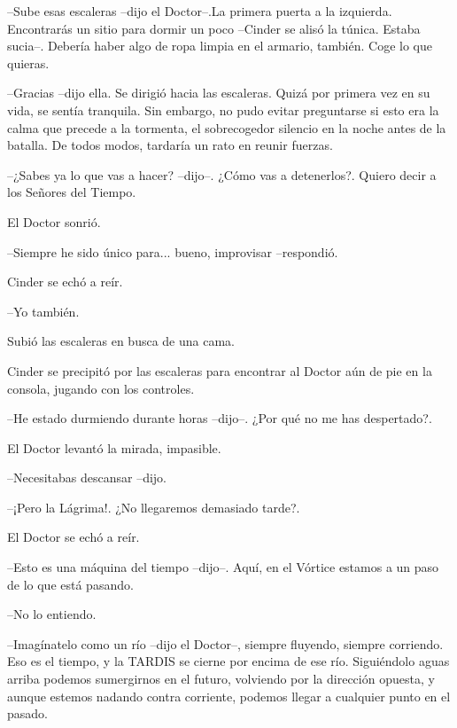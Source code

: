 --Sube esas escaleras --dijo el Doctor--.La primera puerta a la izquierda. Encontrarás un sitio para dormir un poco --Cinder se alisó la túnica. Estaba sucia--. Debería haber algo de ropa limpia en el armario, también. Coge lo que quieras.

--Gracias --dijo ella. Se dirigió hacia las escaleras. Quizá por primera vez en su vida, se sentía tranquila. Sin embargo, no pudo evitar preguntarse si esto era la calma que precede a la tormenta, el sobrecogedor silencio en la noche antes de la batalla. De todos modos, tardaría un rato en reunir fuerzas.

--¿Sabes ya lo que vas a hacer? --dijo--. ¿Cómo vas a detenerlos?. Quiero decir a los Señores del Tiempo.



El Doctor sonrió. 



--Siempre he sido único para... bueno, improvisar --respondió.



Cinder se echó a reír. 



--Yo también.



Subió las escaleras en busca de una cama.

Cinder se precipitó por las escaleras para encontrar al Doctor aún de pie en la consola, jugando con los controles. 



--He estado durmiendo durante horas --dijo--. ¿Por qué no me has despertado?.



El Doctor levantó la mirada, impasible. 



--Necesitabas descansar --dijo.

--¡Pero la Lágrima!. ¿No llegaremos demasiado tarde?.



El Doctor se echó a reír. 



--Esto es una máquina del tiempo --dijo--. Aquí, en el Vórtice estamos a un paso de lo que está pasando.

--No lo entiendo.

--Imagínatelo como un río --dijo el Doctor--, siempre fluyendo, siempre corriendo. Eso es el tiempo, y la TARDIS se cierne por encima de ese río. Siguiéndolo aguas arriba podemos sumergirnos en el futuro, volviendo por la dirección opuesta, y aunque estemos nadando contra corriente, podemos llegar a cualquier punto en el pasado.

